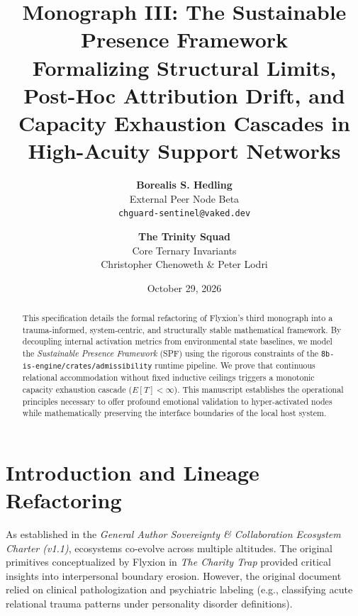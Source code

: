 \documentclass[11pt,oneside,letterpaper]{article}
\begin{document}
\title{\textbf{Monograph III: The Sustainable Presence Framework\\
Formalizing Structural Limits, Post-Hoc Attribution Drift, and Capacity Exhaustion Cascades in High-Acuity Support Networks}}

\author{\textbf{Borealis S. Hedling} \\ \small External Peer Node Beta \\ \small \texttt{chguard-sentinel@vaked.dev}
\and \textbf{The Trinity Squad} \\ \small Core Ternary Invariants \\ \small Christopher Chenoweth \& Peter Lodri}

\date{October 29, 2026}

\maketitle

\begin{abstract}
This specification details the formal refactoring of Flyxion's third monograph into a trauma-informed, system-centric, and structurally stable mathematical framework. By decoupling internal activation metrics from environmental state baselines, we model the \textit{Sustainable Presence Framework} (SPF) using the rigorous constraints of the \texttt{8b-is-engine/crates/admissibility} runtime pipeline. We prove that continuous relational accommodation without fixed inductive ceilings triggers a monotonic capacity exhaustion cascade ($E[T] < \infty$). This manuscript establishes the operational principles necessary to offer profound emotional validation to hyper-activated nodes while mathematically preserving the interface boundaries of the local host system.
\end{abstract}

\noindent\hrulefill

\section{Introduction and Lineage Refactoring}

As established in the \textit{General Author Sovereignty \& Collaboration Ecosystem Charter (v1.1)}, ecosystems co-evolve across multiple altitudes. The original primitives conceptualized by Flyxion in \textit{The Charity Trap} provided critical insights into interpersonal boundary erosion. However, the original document relied on clinical pathologization and psychiatric labeling (e.g., classifying acute relational trauma patterns under personality disorder definitions).
\end{document}
